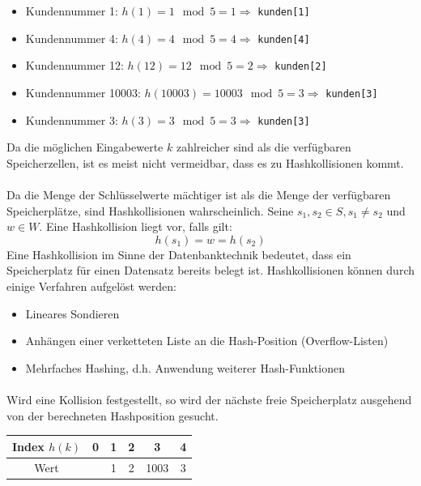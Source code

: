 {\begin{frame}{\insertsection}
\begin{itemize}
		\item Kundennummer 1: $h(1) =  1 \mod 5 = 1 \Rightarrow$ \texttt{kunden[1]}
		\item Kundennummer 4: $h(4) =  4 \mod 5 = 4 \Rightarrow$ \texttt{kunden[4]}
		\item Kundennummer 12: $h(12) =  12 \mod 5 = 2 \Rightarrow$ \texttt{kunden[2]}
		\item Kundennummer 10003: $h(10003) =  10003 \mod 5 = 3 \Rightarrow$ \texttt{kunden[3]}
		\item \alert{Kundennummer 3: $h(3) =  3 \mod 5 = 3 \Rightarrow$ \texttt{kunden[3]}}		
	\end{itemize}	
	\alert{Da die möglichen Eingabewerte $k$ zahlreicher sind als die verfügbaren Speicherzellen, ist es meist nicht vermeidbar, dass es zu Hashkollisionen kommt.}	
\end{frame}
%
\begin{frame}{\insertsection}
	\framesubtitle{\insertsubsection}
	\alert{Da die Menge der Schlüsselwerte mächtiger ist als die Menge der verfügbaren Speicherplätze, sind Hashkollisionen wahrscheinlich. Seine $s_1,s_2 \in S, s_1 \neq s_2$ und $w\in W$. Eine Hashkollision liegt vor, falls gilt:}	
	$$h(s_1) = w = h(s_2)$$	
	Eine Hashkollision im Sinne der Datenbanktechnik bedeutet, dass ein Speicherplatz für einen Datensatz bereits belegt ist. Hashkollisionen können durch einige Verfahren aufgelöst werden: 
	\begin{itemize}
		\item Lineares Sondieren
		\item Anhängen einer verketteten Liste an die Hash-Position (Overflow-Listen)
		\item Mehrfaches Hashing, d.h. Anwendung weiterer Hash-Funktionen 
	\end{itemize}	
\end{frame}
%
\begin{frame}{\insertsection}
	\framesubtitle{\insertsubsection}
		Wird eine Kollision festgestellt, so wird der nächste freie Speicherplatz ausgehend von der berechneten Hashposition gesucht.		
	\vspace{5mm}
	\begin{center}
		\begin{tabular}{|c|c|c|c|c|c|}\hline
			Index $h(k)$ & 0 & 1 & 2 & 3 & 4  \\\hline\hline
			Wert & &1&2 & 1003 &\cellcolor{Yellow}3 \\\hline

\end{tabular}
\end{center}
\end{frame}}

